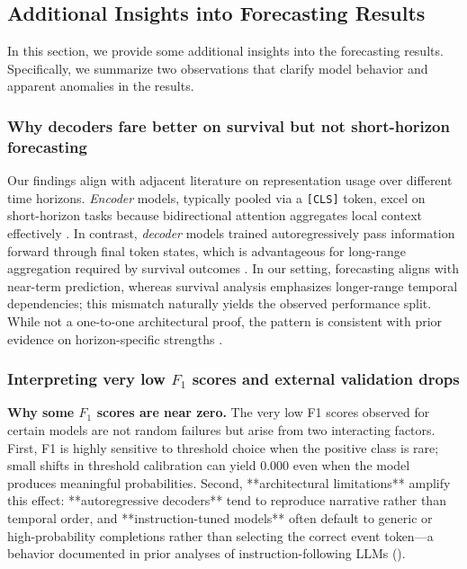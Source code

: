\subsection{Additional Insights into Forecasting Results}
\label{ch07:apd:additional_insights}

In this section, we provide some additional insights into the forecasting results.
Specifically, we summarize two observations that clarify model behavior and apparent anomalies in the results.

\subsubsection{Why decoders fare better on survival but not short-horizon forecasting}
 Our findings align with adjacent literature on representation usage over different time horizons. \emph{Encoder} models, typically pooled via a \texttt{[CLS]} token, excel on short-horizon tasks because bidirectional attention aggregates local context effectively \citep{devlin2019bert,bai2018empirical}.
In contrast, \emph{decoder} models trained autoregressively pass information forward through final token states, which is advantageous for long-range aggregation required by survival outcomes \citep{dai2019style,zhou2021informer}.
In our setting, forecasting aligns with near-term prediction, whereas survival analysis emphasizes longer-range temporal dependencies; this mismatch naturally yields the observed performance split.
While not a one-to-one architectural proof, the pattern is consistent with prior evidence on horizon-specific strengths \citep{wang2025large}.

\subsubsection{Interpreting very low $F_{1}$ scores and external validation drops}
 \textbf{Why some $F_{1}$ scores are near zero.} The very low F1 scores observed for certain models are not random failures but arise from two interacting factors. First, F1 is highly sensitive to threshold choice when the positive class is rare; small shifts in threshold calibration can yield 0.000 even when the model produces meaningful probabilities. Second, **architectural limitations** amplify this effect: **autoregressive decoders** tend to reproduce narrative rather than temporal order, and **instruction-tuned models** often default to generic or high-probability completions rather than selecting the correct event token—a behavior documented in prior analyses of instruction-following LLMs (\cite{liu2024lost,wei2021finetuned}).

